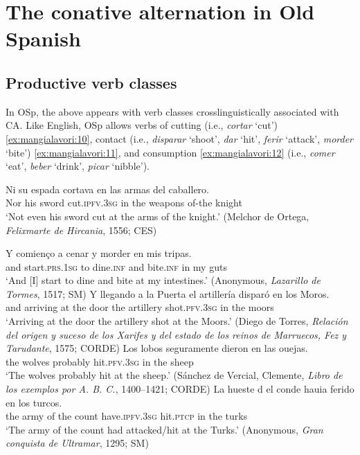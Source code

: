 \documentclass[output=paper,colorlinks,citecolor=brown,
]{langscibook}
\begin{document}
\section{The conative alternation in Old Spanish}\label{sec:mangialavori:2}
\subsection{Productive verb classes}\label{sec:mangialavori:2-1}

In OSp, the above appears with verb classes crosslinguistically associated with CA. Like English, OSp allows verbs of cutting (i.e., \textit{cortar} ‘cut’)  \ref{ex:mangialavori:10}, contact (i.e., \textit{disparar} ‘shoot’, \textit{dar} ‘hit’, \textit{ferir} ‘attack’, \textit{morder} ‘bite’)  \ref{ex:mangialavori:11}, and consumption  \ref{ex:mangialavori:12} (i.e., \textit{comer} ‘eat’, \textit{beber} ‘drink’, \textit{picar} ‘nibble’).

\ea
  \label{ex:mangialavori:10}
  \gll  Ni su espada cortava en las armas del caballero.\\
      Nor his sword cut.\textsc{ipfv}.\textsc{3sg} in the weapons of-the knight\\
  \glt  `Not even his sword cut at the arms of the knight.' (Melchor de Ortega, \textit{Felixmarte de Hircania}, 1556; CES)
\z

\ea\label{ex:mangialavori:11}
  \ea
    \gll Y comienço a cenar y morder en mis tripas.\\
    and start.\textsc{prs}.\textsc{1sg} to dine.\textsc{inf} and bite.\textsc{inf} in my guts\\
    \glt `And [I] start to dine and bite at my intestines.' (Anonymous, \textit{Lazarillo de Tormes}, 1517; SM)
  \ex
    \gll Y llegando a la Puerta el artillería disparó en los Moros.\\
    and arriving at the door the artillery shot.\textsc{pfv}.\textsc{3sg} in the moors\\
    \glt ‘Arriving at the door the artillery shot at the Moors.’ (Diego de Torres, \textit{Relación del origen y suceso de los Xarifes y del estado de los reinos de Marruecos, Fez y Tarudante}, 1575; CORDE)
  \ex
    \gll Los lobos seguramente dieron en las ouejas.\\
    the wolves probably hit.\textsc{pfv}.\textsc{3sg} in the sheep\\
    \glt ‘The wolves probably hit at the sheep.’ (Sánchez de Vercial, Clemente, \textit{Libro de los exemplos por A. B. C.}, 1400--1421; CORDE)
  \ex
    \gll La hueste d el conde hauia ferido en los turcos.\\
    the army of the count  have.\textsc{ipfv}.\textsc{3sg} hit.\textsc{ptcp} in the turks\\
    \glt ‘The army of the count had attacked/hit at the Turks.’ (Anonymous, \textit{Gran conquista de Ultramar}, 1295; SM)
  \z 
\z 
\end{document}
